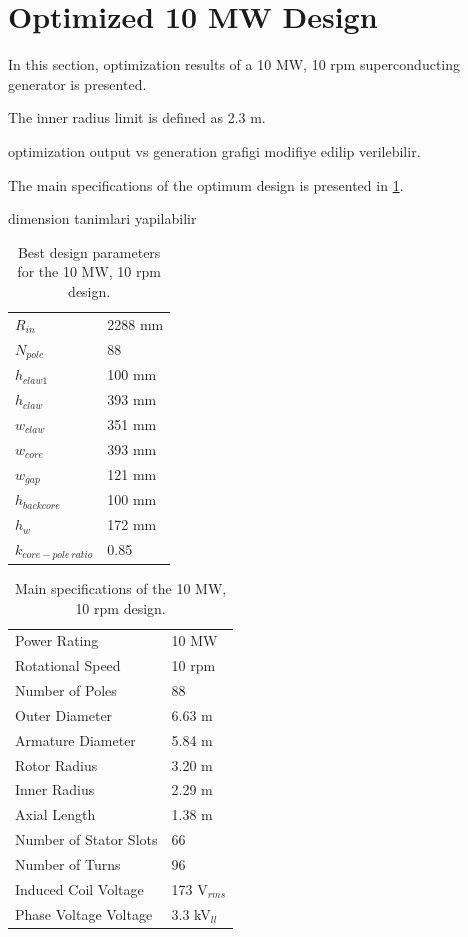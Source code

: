 \documentclass[12pt]{iopart}
\begin{document}
\section{Optimized 10 MW Design}

In this section, optimization results of a 10 MW, 10 rpm superconducting generator is presented. 

The inner radius limit is defined as 2.3 m. 

optimization output vs generation grafigi modifiye edilip verilebilir.

The main specifications of the optimum design is presented in \ref{10MW_design_parameters}.

dimension tanimlari yapilabilir

\begin{table}
  \centering
  \begin{tabular}{ll}
\hline
$R_{in}$ & 2288 mm \\
$N_{pole}$ & 88 \\
$h_{claw1}$ & 100 mm\\
$h_{claw}$ & 393 mm\\
$w_{claw}$ & 351 mm\\
$w_{core}$ & 393 mm\\
$w_{gap}$ & 121 mm\\
$h_{backcore}$ & 100 mm\\
$h_{w}$ & 172 mm\\
$k_{core-pole \, ratio}$ & 0.85 \\
\hline
 \end{tabular}
  \caption{Best design parameters for the 10 MW, 10 rpm design.}
  \label{10MW_design_parameters}
\end{table}

\begin{table}[t]
  \centering
  \begin{tabular}{ll}
\hline
Power Rating & 10 MW \\
Rotational Speed & 10 rpm \\
Number of Poles & 88 \\
\hline
Outer Diameter & 6.63 m \\
Armature Diameter & 5.84 m \\
Rotor Radius & 3.20 m \\
Inner Radius & 2.29 m \\
Axial Length & 1.38 m \\
\hline
Number of Stator Slots & 66 \\
Number of Turns & 96 \\
Induced Coil Voltage & 173 V$_{rms}$\\
Phase Voltage Voltage & 3.3 kV$_{ll}$ \\
\hline
 \end{tabular}
  \caption{Main specifications of the 10 MW, 10 rpm design.}
  \label{10MW_spec}
\end{table}
\end{document}
